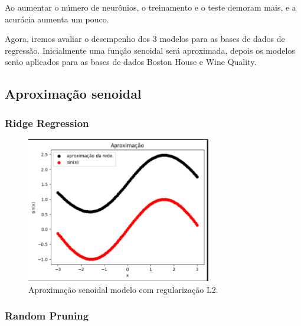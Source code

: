 \documentclass{article}
\begin{document}
Ao aumentar o número de neurônios, o treinamento e o teste demoram mais, e a acurácia aumenta um pouco.

\vspace{25pt}

Agora, iremos avaliar o desempenho dos 3 modelos para as bases de dados de regressão. Inicialmente uma função senoidal será aproximada, depois os modelos serão aplicados para as bases de dados Boston House e Wine Quality.

\newpage

\subsection{Aproximação senoidal}

\subsubsection*{Ridge Regression}

\vspace{25pt}

\begin{figure}[h]

    \centering
    \includegraphics[height=2.5in]{sin_l2.png}
    \caption{Aproximação senoidal modelo com regularização L2.}
    \label{fig:example}
    
\end{figure}

\subsubsection*{Random Pruning}

\vspace{25pt}
\end{document}

